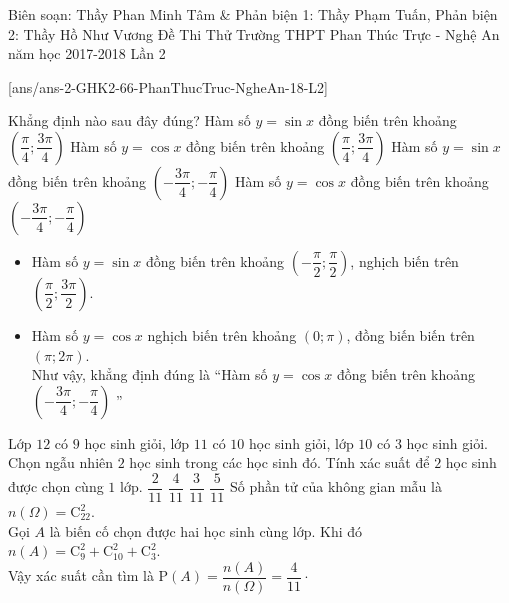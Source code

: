 \begin{name}
{Biên soạn: Thầy Phan Minh Tâm \& Phản biện 1: Thầy Phạm Tuấn, Phản biện 2: Thầy Hồ Như Vương}
{Đề Thi Thử Trường THPT Phan Thúc Trực - Nghệ An năm học 2017-2018 Lần 2}
\end{name}
\setcounter{ex}{0}\setcounter{bt}{0}
[ans/ans-2-GHK2-66-PhanThucTruc-NgheAn-18-L2]

\begin{ex}%
	
Khẳng định nào sau đây đúng?
\choice
{Hàm số $ y = \sin x $ đồng biến trên khoảng $ \left(\dfrac{\pi}{4}; \dfrac{3\pi}{4}\right) $}
{Hàm số $ y = \cos x $ đồng biến trên khoảng $ \left(\dfrac{\pi}{4}; \dfrac{3\pi}{4}\right) $}
{Hàm số $ y = \sin x $ đồng biến trên khoảng $ \left(-\dfrac{3\pi}{4};- \dfrac{\pi}{4}\right) $}
{\True Hàm số $ y = \cos x $ đồng biến trên khoảng $ \left(-\dfrac{3\pi}{4};- \dfrac{\pi}{4}\right) $}
\loigiai
{\begin{itemize}
		\item Hàm số $ y = \sin x  $ đồng biến trên khoảng $ \left(-\dfrac{\pi}{2}; \dfrac{\pi }{2}\right) $, nghịch biến trên $ \left(\dfrac{\pi}{2}; \dfrac{3\pi }{2}\right) $.
		\item Hàm số $ y = \cos x  $ nghịch biến trên khoảng $ \left(0; \pi \right) $, đồng biến biến trên $ \left(\pi; 2\pi \right) $.\\
	Như vậy, khẳng định đúng là ``Hàm số $ y = \cos x $ đồng biến trên khoảng $ \left(-\dfrac{3\pi}{4};- \dfrac{\pi}{4}\right) $ ''	
	\end{itemize}

}
\end{ex}
%
\begin{ex}%
Lớp $ 12 $	 có $ 9 $ học sinh giỏi, lớp $ 11 $ có $ 10 $ học sinh giỏi, lớp $ 10 $ có $ 3 $ học sinh giỏi. Chọn ngẫu nhiên $ 2 $ học sinh trong các học sinh đó. Tính xác suất để $ 2 $ học sinh được chọn cùng $ 1 $ lớp.
	\choice
	{$ \dfrac{2}{11} $}
	{\True $ \dfrac{4}{11} $}
	{$ \dfrac{3}{11} $}
	{$ \dfrac{5}{11} $}
\loigiai
{
Số phần tử của không gian mẫu là $ n\left(\Omega\right) = \mathrm{C}_{22}^2  $.\\
Gọi $ A $ là biến cố chọn được hai học sinh cùng lớp. Khi đó $ n(A) = \mathrm{C}_9^2 + \mathrm{C}_{10}^2 + \mathrm{C}_3^2$.\\
Vậy xác suất cần tìm là $ \mathrm{P}(A) = \dfrac{n(A)}{n(\Omega) }= \dfrac{4}{11} \cdot$
}	
	
\end{ex}
